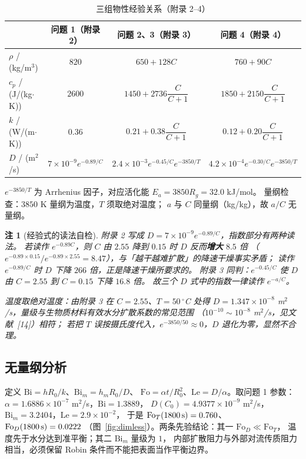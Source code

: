 \documentclass[withoutpreface,bwprint]{cumcmthesis}
\newtheorem{remark}{注}
\begin{document}
\begin{table}[H]
\centering
\small
\caption{三组物性经验关系（附录 2--4）}
\begin{tabular}{@{}lccc@{}}
\toprule
 & 问题 1（附录 2） & 问题 2、3（附录 3） & 问题 4（附录 4） \\
\midrule
$\rho$ / (kg/m$^3$) & $820$ & $650+128C$ & $760+90C$ \\
$c_p$ / (J/(kg$\cdot$K)) & $2600$ & $1450+2736\dfrac{C}{C+1}$ & $1850+2150\dfrac{C}{C+1}$ \\
$k$ / (W/(m$\cdot$K)) & $0.36$ & $0.21+0.38\dfrac{C}{C+1}$ & $0.12+0.20\dfrac{C}{C+1}$ \\
$D$ / (m$^2$/s) & $7\times10^{-9}e^{-0.89/C}$ &
$2.4\times10^{-3}e^{-0.45/C}e^{-3850/T}$ &
$4.2\times10^{-4}e^{-0.30/C}e^{-3850/T}$ \\
\bottomrule
\end{tabular}
\end{table}

$e^{-3850/T}$ 为 Arrhenius 因子，对应活化能 $E_a=3850R_g=32.0$ kJ/mol。
量纲检查：$3850$ K 量纲为温度，$T$ 须取绝对温度；
$a$ 与 $C$ 同量纲（kg/kg），故 $a/C$ 无量纲。

\begin{remark}[经验式的读法自检]
附录 2 写成 $D=7\times10^{-9}e^{-0.89/C}$，指数部分有两种读法。
若读作 $e^{-0.89C}$，则 $C$ 由 $2.55$ 降到 $0.15$ 时 $D$ 反而\textbf{增大} $8.5$ 倍
（$e^{-0.89\times0.15}/e^{-0.89\times2.55}=8.47$），与「越干越难扩散」的降速干燥事实矛盾；
读作 $e^{-0.89/C}$ 时 $D$ 下降 $266$ 倍，正是降速干燥所要求的。
附录 3 同判：$e^{-0.45/C}$ 使 $D$ 由 $C=2.55$ 到 $C=0.15$ 下降 $16.8$ 倍。
故三个 $D$ 式中的指数一律读作 $e^{-a/C}$。

温度取绝对温度：由附录 3 在 $C=2.55$、$T=50\,^\circ$C 处得
$D=1.347\times10^{-8}$ m$^2$/s，量级与生物质材料有效水分扩散系数的常见范围
（$10^{-10}\sim10^{-8}$ m$^2$/s，见文献~[14]）相符；
若把 $T$ 误按摄氏度代入，$e^{-3850/50}\approx0$，$D$ 退化为零，显然不合理。
\end{remark}

\subsection{无量纲分析}

定义 $\mathrm{Bi}=hR_0/k$、$\mathrm{Bi}_m=h_mR_0/D$、
$\mathrm{Fo}=\alpha t/R_0^2$、$\mathrm{Le}=D/\alpha$。取问题 1 参数：
$\alpha=1.6886\times10^{-7}$ m$^2$/s，$\mathrm{Bi}=1.3889$，
$D(C_0)=4.9377\times10^{-9}$ m$^2$/s，$\mathrm{Bi}_m=3.2404$，$\mathrm{Le}=2.9\times10^{-2}$，
于是 $\mathrm{Fo}_T(1800\,{\rm s})=0.760$、$\mathrm{Fo}_D(1800\,{\rm s})=0.0222$
（图~\ref{fig:dimless}）。两条先验结论：其一 $\mathrm{Fo}_D\ll\mathrm{Fo}_T$，
温度先于水分达到准平衡；其二 $\mathrm{Bi}_m$ 量级为 $1$，
内部扩散阻力与外部对流传质阻力相当，必须保留 Robin 条件而不能把表面当作平衡边界。
\end{document}

